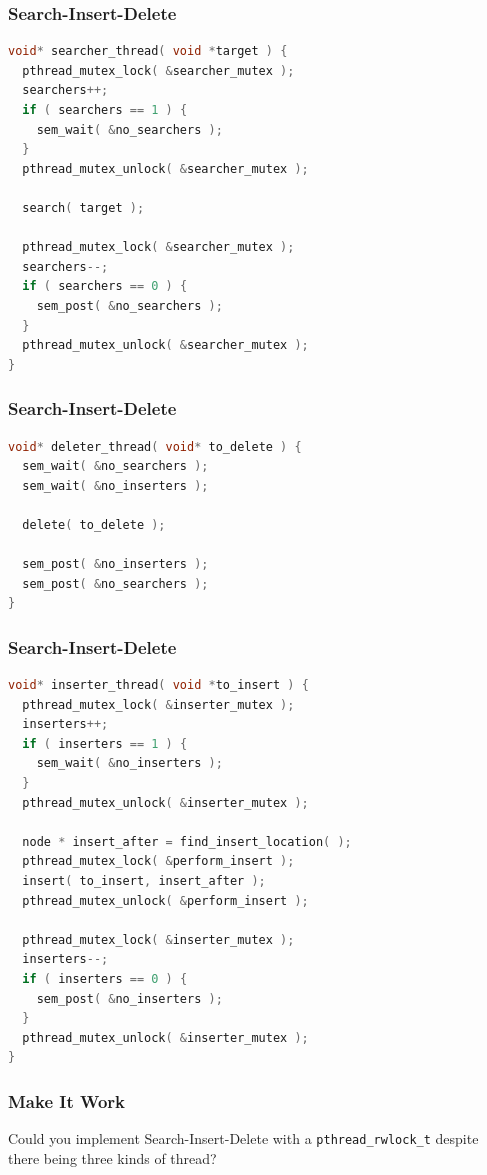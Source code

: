 \begin{frame}[fragile]
	\frametitle{Search-Insert-Delete}
	\begin{lstlisting}[language=C]
void* searcher_thread( void *target ) {
  pthread_mutex_lock( &searcher_mutex );
  searchers++;
  if ( searchers == 1 ) {
    sem_wait( &no_searchers );
  }
  pthread_mutex_unlock( &searcher_mutex );
  
  search( target );
  
  pthread_mutex_lock( &searcher_mutex );
  searchers--;
  if ( searchers == 0 ) {
    sem_post( &no_searchers );
  }
  pthread_mutex_unlock( &searcher_mutex );
}
\end{lstlisting}
\end{frame}

\begin{frame}[fragile]
	\frametitle{Search-Insert-Delete}
	\begin{lstlisting}[language=C]
void* deleter_thread( void* to_delete ) {
  sem_wait( &no_searchers );
  sem_wait( &no_inserters );
  
  delete( to_delete );
  
  sem_post( &no_inserters );
  sem_post( &no_searchers );
}
\end{lstlisting}
\end{frame}

\begin{frame}[fragile]
	\frametitle{Search-Insert-Delete}
	\begin{lstlisting}[language=C]
void* inserter_thread( void *to_insert ) {
  pthread_mutex_lock( &inserter_mutex );
  inserters++;
  if ( inserters == 1 ) {
    sem_wait( &no_inserters );
  }
  pthread_mutex_unlock( &inserter_mutex );
  
  node * insert_after = find_insert_location( );
  pthread_mutex_lock( &perform_insert );
  insert( to_insert, insert_after );
  pthread_mutex_unlock( &perform_insert );
  
  pthread_mutex_lock( &inserter_mutex );
  inserters--;
  if ( inserters == 0 ) {
    sem_post( &no_inserters );
  }
  pthread_mutex_unlock( &inserter_mutex );
}
\end{lstlisting}
\end{frame}

\begin{frame}
\frametitle{Make It Work}

Could you implement Search-Insert-Delete with a \texttt{pthread\_rwlock\_t} despite there being three kinds of thread?

\end{frame}




